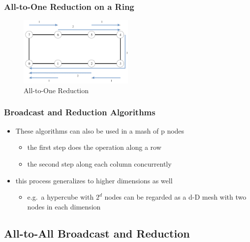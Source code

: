 \hypertarget{all-to-one-reduction-on-a-ring}{%
\subsubsection{All-to-One Reduction on a
Ring}\label{all-to-one-reduction-on-a-ring}}

\begin{figure}[H]
\centering
\includegraphics[width=0.5\textwidth]{figures/all-to-one-reduction-ring.png}
\caption{All-to-One Reduction}
\end{figure}

\hypertarget{broadcast-and-reduction-algorithms}{%
\subsubsection{Broadcast and Reduction
Algorithms}\label{broadcast-and-reduction-algorithms}}

\begin{itemize}
\tightlist
\item
  These algorithms can also be used in a mash of p nodes

  \begin{itemize}
  \tightlist
  \item
    the first step does the operation along a row
  \item
    the second step along each column concurrently
  \end{itemize}
\item
  this process generalizes to higher dimensions as well

  \begin{itemize}
  \tightlist
  \item
    e.g.~a hypercube with $2^d$ nodes can be regarded as a d-D mesh with
    two nodes in each dimension
  \end{itemize}
\end{itemize}

\hypertarget{all-to-all-broadcast-and-reduction}{%
\subsection{All-to-All Broadcast and
Reduction}\label{all-to-all-broadcast-and-reduction}}

